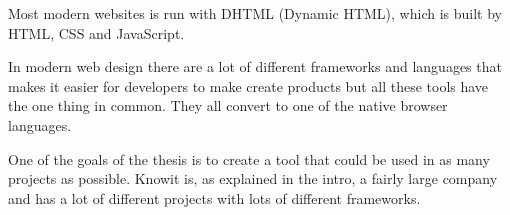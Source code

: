 Most modern websites is run with DHTML (Dynamic HTML), which is built by HTML, CSS and JavaScript.  



In modern web design there are a lot of different frameworks and languages that makes it easier for developers to make create products but all these tools have the one thing in common. They all convert to one of the native browser languages. 

One of the goals of the thesis is to create a tool that could be used in as many projects as possible. Knowit is, as explained in the intro, a fairly large company and has a lot of different projects with lots of different frameworks.   


